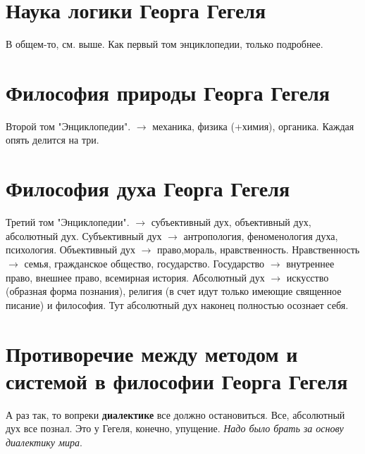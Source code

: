 \section{Наука логики Георга Гегеля}
В общем-то, см. выше. Как первый том энциклопедии, только подробнее.

\section{Философия природы Георга Гегеля}
Второй том "Энциклопедии". $\rightarrow$ механика, физика (+химия), органика. Каждая опять делится на три.

\section{Философия духа Георга Гегеля}
Третий том "Энциклопедии". $\rightarrow$ субъективный дух, объективный дух, абсолютный дух.
Субъективный дух $\rightarrow$  антропология, феноменология духа, психология. Объективный дух  $\rightarrow$ право,мораль, нравственность. Нравственность $\rightarrow$ семья, гражданское общество, государство. Государство $\rightarrow$ внутреннее право, внешнее право, всемирная история. Абсолютный дух $\rightarrow$ искусство (образная форма познания), религия (в счет идут только имеющие священное писание) и философия. Тут абсолютный дух наконец полностью осознает себя.

\section{Противоречие между методом и системой в философии Георга Гегеля}
А раз так, то вопреки \textbf{диалектике} все должно остановиться. Все, абсолютный дух все познал. Это у Гегеля, конечно, упущение. \textit{Надо было брать за основу диалектику мира}.

